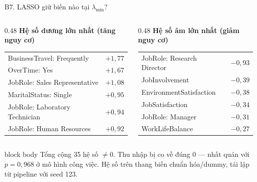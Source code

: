 \documentclass[10pt,aspectratio=169]{beamer}
\begin{document}
\begin{frame}{B7. LASSO giữ biến nào tại $\lambda_{\min}$?}
  \begin{columns}[T,onlytextwidth]
    \begin{column}{0.48\textwidth}
      \centering\small
      \textbf{\color{HCMUSRed}Hệ số dương lớn nhất (tăng nguy cơ)}\\[0.10cm]
      \scriptsize
      \renewcommand{\arraystretch}{1.2}
      \begin{tabular}{lr}
        \toprule
        BusinessTravel: Frequently & $+1{,}77$\\
        OverTime: Yes & $+1{,}67$\\
        JobRole: Sales Representative & $+1{,}08$\\
        MaritalStatus: Single & $+0{,}95$\\
        JobRole: Laboratory Technician & $+0{,}94$\\
        JobRole: Human Resources & $+0{,}92$\\
        \bottomrule
      \end{tabular}
    \end{column}
    \begin{column}{0.48\textwidth}
      \centering\small
      \textbf{\color{HCMUSGreen}Hệ số âm lớn nhất (giảm nguy cơ)}\\[0.10cm]
      \scriptsize
      \renewcommand{\arraystretch}{1.2}
      \begin{tabular}{lr}
        \toprule
        JobRole: Research Director & $-0{,}93$\\
        JobInvolvement & $-0{,}39$\\
        EnvironmentSatisfaction & $-0{,}38$\\
        JobSatisfaction & $-0{,}34$\\
        JobRole: Manager & $-0{,}31$\\
        WorkLifeBalance & $-0{,}27$\\
        \bottomrule
      \end{tabular}
    \end{column}
  \end{columns}
  \vspace{0.25cm}
  \begin{beamercolorbox}[sep=0.14cm,rounded=true]{block body}
    \small
    Tổng cộng 35 hệ số $\neq 0$. Thu nhập bị co về đúng 0 --- nhất quán với
    $p = 0{,}968$ ở mô hình công việc. Hệ số trên thang biến chuẩn hóa/dummy,
    tái lập từ pipeline với seed 123.
  \end{beamercolorbox}
\end{frame}
\end{document}
